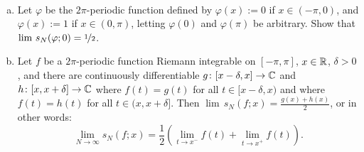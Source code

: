\begin{exercise}
{\ }
\begin{enumerate}[a)]
\item
Let $\varphi$ be the $2\pi$-periodic function 
defined by $\varphi(x) := 0$ if $x \in (-\pi,0)$,
and $\varphi(x) := 1$ if $x \in (0,\pi)$,
letting $\varphi(0)$ and $\varphi(\pi)$ be arbitrary.  Show
that $\lim \, s_N(\varphi;0) = \nicefrac{1}{2}$.
\item
Let $f$ be a $2\pi$-periodic function
Riemann integrable on $[-\pi,\pi]$, 
$x \in {\mathbb{R}}$, $\delta > 0$, and
there are continuously differentiable
$g \colon [x-\delta,x] \to {\mathbb{C}}$
and $h \colon [x,x+\delta] \to {\mathbb{C}}$
where $f(t) = g(t)$ for all $t \in [x-\delta,x)$
and
where $f(t) = h(t)$ for all $t \in (x,x+\delta]$.
Then
$\lim\, s_N(f;x) = \frac{g(x)+h(x)}{2}$, or in other words:
\begin{equation*}
\lim_{N \to \infty} s_N(f;x) =
\frac{1}{2}
\left(
\lim_{t \to x^-} f(t) +
\lim_{t \to x^+} f(t)
\right) .
\end{equation*}
\end{enumerate}
\end{exercise}
